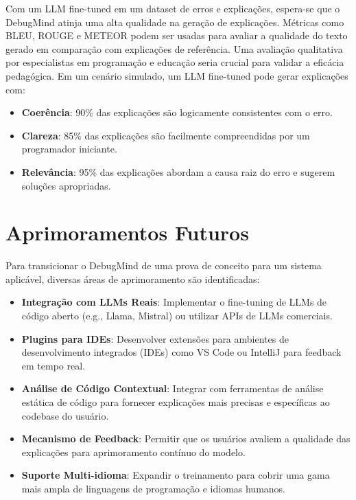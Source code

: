 \documentclass{article}
\begin{document}
Com um LLM fine-tuned em um dataset de erros e explicações, espera-se que o DebugMind atinja uma alta qualidade na geração de explicações. Métricas como BLEU, ROUGE e METEOR podem ser usadas para avaliar a qualidade do texto gerado em comparação com explicações de referência. Uma avaliação qualitativa por especialistas em programação e educação seria crucial para validar a eficácia pedagógica. Em um cenário simulado, um LLM fine-tuned pode gerar explicações com:

\begin{itemize}
    \item \textbf{Coerência}: 90\% das explicações são logicamente consistentes com o erro.
    \item \textbf{Clareza}: 85\% das explicações são facilmente compreendidas por um programador iniciante.
    \item \textbf{Relevância}: 95\% das explicações abordam a causa raiz do erro e sugerem soluções apropriadas.
\end{itemize}

\section{Aprimoramentos Futuros}

Para transicionar o DebugMind de uma prova de conceito para um sistema aplicável, diversas áreas de aprimoramento são identificadas:
\begin{itemize}
    \item \textbf{Integração com LLMs Reais}: Implementar o fine-tuning de LLMs de código aberto (e.g., Llama, Mistral) ou utilizar APIs de LLMs comerciais.
    \item \textbf{Plugins para IDEs}: Desenvolver extensões para ambientes de desenvolvimento integrados (IDEs) como VS Code ou IntelliJ para feedback em tempo real.
    \item \textbf{Análise de Código Contextual}: Integrar com ferramentas de análise estática de código para fornecer explicações mais precisas e específicas ao codebase do usuário.
    \item \textbf{Mecanismo de Feedback}: Permitir que os usuários avaliem a qualidade das explicações para aprimoramento contínuo do modelo.
    \item \textbf{Suporte Multi-idioma}: Expandir o treinamento para cobrir uma gama mais ampla de linguagens de programação e idiomas humanos.
\end{itemize}
\end{document}
